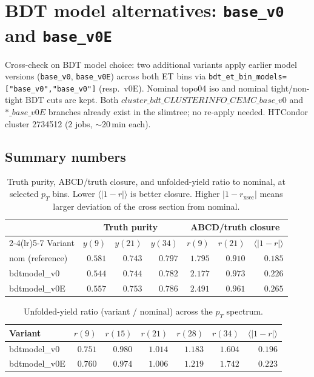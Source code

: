 \documentclass[11pt,a4paper]{article}
\begin{document}
\section*{BDT model alternatives: \texttt{base\_v0} and \texttt{base\_v0E}}

Cross-check on BDT model choice: two additional variants apply earlier model
versions (\texttt{base\_v0}, \texttt{base\_v0E}) across both ET bins via
\texttt{bdt\_et\_bin\_models=["base\_v0","base\_v0"]} (resp.\ v0E). Nominal
topo04 iso and nominal tight/non-tight BDT cuts are kept. Both $cluster\_bdt\_CLUSTERINFO\_CEMC\_base\_v0$ and $*\_base\_v0E$
branches already exist in the slimtree; no re-apply needed.
HTCondor cluster 2734512 (2 jobs, $\sim$20\,min each).

\subsection*{Summary numbers}

\begin{table}[H]
\centering
\caption{Truth purity, ABCD/truth closure, and unfolded-yield ratio to nominal,
at selected $p_T$ bins. Lower $\langle|1-r|\rangle$ is better closure.
Higher $|1-r_\mathrm{xsec}|$ means larger deviation of the cross section from nominal.}
\begin{tabular}{lrrrrrr}
\toprule
 & \multicolumn{3}{c}{Truth purity} & \multicolumn{3}{c}{ABCD/truth closure} \\
\cmidrule(lr){2-4}\cmidrule(lr){5-7}
Variant & $y(9)$ & $y(21)$ & $y(34)$ & $r(9)$ & $r(21)$ & $\langle|1-r|\rangle$ \\
\midrule
nom (reference)       & $0.581$ & $0.743$ & $0.797$ & $1.795$ & $0.910$ & $0.185$ \\
bdtmodel\_v0          & $0.544$ & $0.744$ & $0.782$ & $2.177$ & $0.973$ & $0.226$ \\
bdtmodel\_v0E         & $0.557$ & $0.753$ & $0.786$ & $2.491$ & $0.961$ & $0.265$ \\
\bottomrule
\end{tabular}
\end{table}

\begin{table}[H]
\centering
\caption{Unfolded-yield ratio (variant / nominal) across the $p_T$ spectrum.}
\begin{tabular}{lrrrrrr}
\toprule
Variant & $r(9)$ & $r(15)$ & $r(21)$ & $r(28)$ & $r(34)$ & $\langle|1-r|\rangle$ \\
\midrule
bdtmodel\_v0    & $0.751$ & $0.980$ & $1.014$ & $1.183$ & $1.604$ & $0.196$ \\
bdtmodel\_v0E   & $0.760$ & $0.974$ & $1.006$ & $1.219$ & $1.742$ & $0.223$ \\
\bottomrule
\end{tabular}
\end{table}
\end{document}
